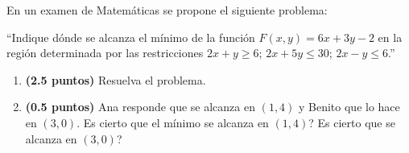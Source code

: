 
En un examen de Matemáticas se propone el siguiente problema:

``Indique dónde se alcanza el mínimo de la función $F(x,y)=6x+3y-2$ en la región determinada por las restricciones $2x+y\geq6$; $2x+5y\leq30$; $2x-y\leq6$.''
\begin{enumerate}[label=\alph*)]
\item \textbf{(2.5 puntos)} Resuelva el problema.
\item \textbf{(0.5 puntos)} Ana responde que se alcanza en $(1,4)$ y Benito que lo hace en $(3,0)$. \textquestiondown{}Es cierto que el mínimo se alcanza en $(1,4)$? \textquestiondown{}Es cierto que se alcanza en $(3,0)$?
\end{enumerate}

